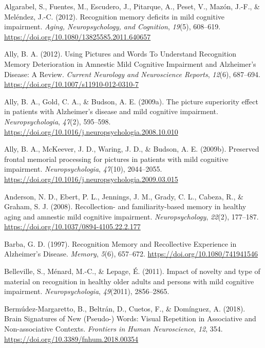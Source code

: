 \documentclass[
  11pt,
]{article}
\begin{document}
\leavevmode\hypertarget{ref-algarabel2012}{}%
Algarabel, S., Fuentes, M., Escudero, J., Pitarque, A., Peset, V.,
Mazón, J.-F., \& Meléndez, J.-C. (2012). Recognition memory deficits in
mild cognitive impairment. \emph{Aging, Neuropsychology, and Cognition},
\emph{19}(5), 608--619.
\url{https://doi.org/10.1080/13825585.2011.640657}

\leavevmode\hypertarget{ref-ally2012}{}%
Ally, B. A. (2012). Using Pictures and Words To Understand Recognition
Memory Deterioration in Amnestic Mild Cognitive Impairment and
Alzheimer's Disease: A Review. \emph{Current Neurology and Neuroscience
Reports}, \emph{12}(6), 687--694.
\url{https://doi.org/10.1007/s11910-012-0310-7}

\leavevmode\hypertarget{ref-ally2009}{}%
Ally, B. A., Gold, C. A., \& Budson, A. E. (2009a). The picture
superiority effect in patients with Alzheimer's disease and mild
cognitive impairment. \emph{Neuropsychologia}, \emph{47}(2), 595--598.
\url{https://doi.org/10.1016/j.neuropsychologia.2008.10.010}

\leavevmode\hypertarget{ref-ally2009a}{}%
Ally, B. A., McKeever, J. D., Waring, J. D., \& Budson, A. E. (2009b).
Preserved frontal memorial processing for pictures in patients with mild
cognitive impairment. \emph{Neuropsychologia}, \emph{47}(10),
2044--2055. \url{https://doi.org/10.1016/j.neuropsychologia.2009.03.015}

\leavevmode\hypertarget{ref-anderson2008}{}%
Anderson, N. D., Ebert, P. L., Jennings, J. M., Grady, C. L., Cabeza,
R., \& Graham, S. J. (2008). Recollection- and familiarity-based memory
in healthy aging and amnestic mild cognitive impairment.
\emph{Neuropsychology}, \emph{22}(2), 177--187.
\url{https://doi.org/10.1037/0894-4105.22.2.177}

\leavevmode\hypertarget{ref-barba1997}{}%
Barba, G. D. (1997). Recognition Memory and Recollective Experience in
Alzheimer's Disease. \emph{Memory}, \emph{5}(6), 657--672.
\url{https://doi.org/10.1080/741941546}

\leavevmode\hypertarget{ref-belleville2011}{}%
Belleville, S., Ménard, M.-C., \& Lepage, É. (2011). Impact of novelty
and type of material on recognition in healthy older adults and persons
with mild cognitive impairment. \emph{Neuropsychologia},
\emph{49}(2011), 2856--2865.

\leavevmode\hypertarget{ref-bermudez-margaretto2018}{}%
Bermúdez-Margaretto, B., Beltrán, D., Cuetos, F., \& Domínguez, A.
(2018). Brain Signatures of New (Pseudo-) Words: Visual Repetition in
Associative and Non-associative Contexts. \emph{Frontiers in Human
Neuroscience}, \emph{12}, 354.
\url{https://doi.org/10.3389/fnhum.2018.00354}
\end{document}
